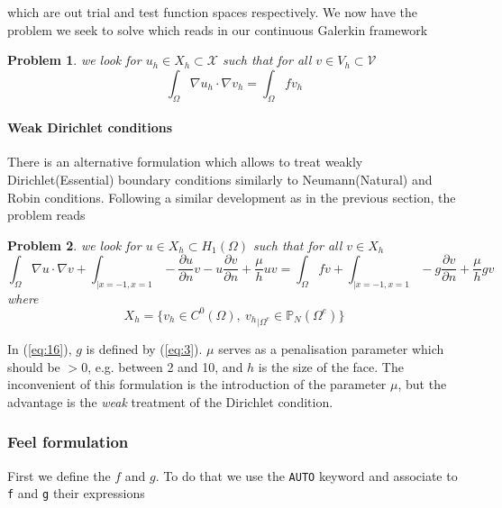 \documentclass[a4paper]{book}
\newtheorem{problem}{Problem}
\begin{document}
which are out trial and test function spaces respectively.  We now
have the problem we seek to solve which reads in our continuous
Galerkin framework
\begin{problem}
  \label{prob:2}
  we look for $u_h \in X_h \subset \mathcal{X}$ such that for all $v
  \in V_h \subset \mathcal{V}$
  \begin{equation}
    \label{eq:20}
    \int_\Omega \nabla u_h \cdot \nabla v_h  = \int_\Omega f v_h
  \end{equation}
\end{problem}

\paragraph{Weak Dirichlet conditions}
\label{sec:weak-dirichl-cond}

There is an alternative formulation which allows to treat weakly
Dirichlet(Essential) boundary conditions similarly to Neumann(Natural)
and Robin conditions. Following a similar development as in the previous section, the problem reads
\begin{problem}
  \label{prob:3}
  we look for $u \in X_h \subset H_1(\Omega)$ such that for all $v \in
  X_h$
\begin{equation}
  \label{eq:16}
  \int_\Omega \nabla u \cdot \nabla v +
  \int_{|x=-1,x=1} -\frac{\partial u}{\partial n} v - u \frac{\partial v}{\partial n} + \frac{\mu}{h} u v
  =
  \int_\Omega f v +
  \int_{|x=-1,x=1}  - g \frac{\partial v}{\partial n} + \frac{\mu}{h} g v
\end{equation}
where
\begin{equation}
  \label{eq:19}
  X_h = \Big\{ v_h \in C^0(\Omega),\ {v_h}_{|\Omega^e} \in \mathbb{P}_N( \Omega^e ) \Big\}
\end{equation}
\end{problem}
In (\ref{eq:16}), $g$ is defined by (\ref{eq:3}). $\mu$ serves as a penalisation
parameter which should be $> 0$, e.g. between 2 and 10, and $h$ is the
size of the face. The inconvenient of this formulation is the
introduction of the parameter $\mu$, but the advantage is the
\emph{weak} treatment of the Dirichlet condition.

\subsubsection{Feel formulation}
\label{sec:feel-formulation-1}

First we define the $f$ and $g$. To do that we use the
\lstinline!AUTO! keyword and associate to \lstinline!f! and
\lstinline!g! their expressions
\end{document}
